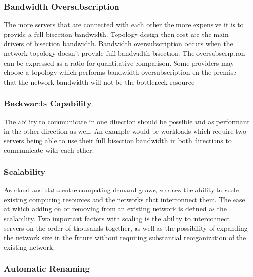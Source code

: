 \documentclass[12pt]{article}
\begin{document}
\subsubsection{Bandwidth Oversubscription} \label{ssub:bandwidth-oversubscription}

The more servers that are connected with each other the more expensive it is to provide a full bisection bandwidth. Topology design then cost are the main drivers of bisection bandwidth.  Bandwidth oversubscription occurs when the network topology doesn't provide full bandwidth bisection. The oversubscription can be expressed as a ratio for quantitative comparison. Some providers may choose a topology which performs bandwidth oversubscription on the premise that the network bandwidth will not be the bottleneck resource.


\subsubsection{Backwards Capability} \label{ssub:backwards-capability}

The ability to communicate in one direction should be possible and as performant in the other direction as well. An example would be workloads which require two servers being able to use their full bisection bandwidth in both directions to communicate with each other.


\subsubsection{Scalability} \label{ssub:net-scalability}

As cloud and datacentre computing demand grows, so does the ability to scale existing computing resources and the networks that interconnect them. The ease at which adding on or removing from an existing network is defined as the scalability. Two important factors with scaling is the ability to interconnect servers on the order of thousands together, as well as the possibility of expanding the network size in the future without requiring substantial reorganization of the existing network.


\subsubsection{Automatic Renaming} \label{ssub:auto-renaming}
\end{document}
